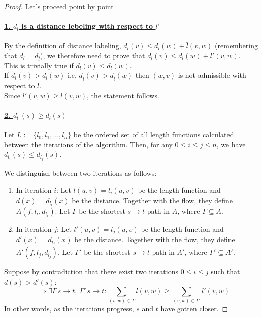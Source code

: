     \begin{proof}
        Let's proceed point by point
    
            \paragraph*{\underline{1. $d_l$ is a distance lebeling with respect to $l'$}}
            By the definition of distance labeling, $d_l(v) \le d_l(w) + \bar{l}(v,w)$ (remembering that $d_l = d_{\bar{l}}$),
            we therefore need to prove that  $d_l(v) \le d_l(w) + l'(v,w)$.\\
            This is trivially true if $d_l(v) \le d_l(w)$.\\
            If $d_l(v) > d_l(w)$ i.e. $d_{\bar{l}}(v) > d_{\bar{l}}(w)$ then $(w,v)$ is not admissible with respect to $\bar{l}$.\\
            Since $l'(v,w)\ge \bar{l}(v,w)$, the statement follows.

            \paragraph*{\underline{2. $d_{l'}(s) \ge d_l(s)$}}

            Let \( L := \{ l_0, l_1, ..., l_n \} \) be the ordered set of all length functions calculated between the iterations of the algorithm. Then, for any \( 0 \le i \le j \le n \), we have \( d_{l_i}(s) \le d_{l_j}(s) \).

            We distinguish between two iterations as follows:
            \begin{enumerate}
                \item In iteration \( i \):
                Let \( l(u,v) = l_i(u,v) \) be the length function and \( d(x) = d_{l_i}(x) \) be the distance. Together with the flow, they define \( A(f, l_i, d_{l_i}) \). Let \( \Gamma \) be the shortest \( s \rightarrow t \) path in \( A \), where \( \Gamma \subseteq A \).
                \item In iteration \( j \):
                Let \( l'(u,v) = l_j(u,v) \) be the length function and \( d'(x) = d_{l_j}(x) \) be the distance. Together with the flow, they define \( A'(f, l_j, d_{l_j}) \). Let \( \Gamma' \) be the shortest \( s \rightarrow t \) path in \( A' \), where \( \Gamma' \subseteq A' \).
            \end{enumerate}
       
            Suppose by contradiction that there exist two iterations \( 0 \le i \le j \) such that \( d(s) > d'(s) \):
            \[
            \implies \exists \Gamma \, s \rightarrow t,\ \Gamma' \, s \rightarrow t : \sum_{(v,w) \in \Gamma} l(v,w) \ge \sum_{(v,w) \in \Gamma'} l'(v,w)
            \]
            In other words, as the iterations progress, \( s \) and \( t \) have gotten closer.


\end{proof}
